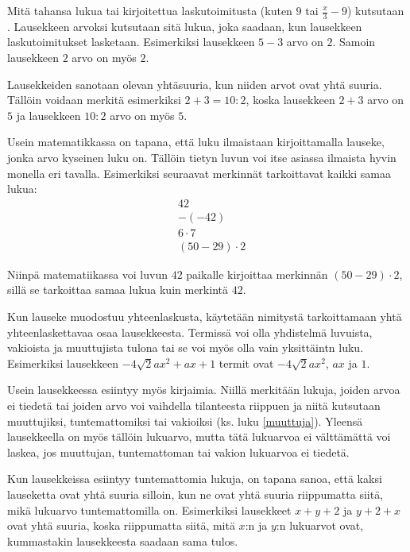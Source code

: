Mitä tahansa lukua tai kirjoitettua laskutoimitusta (kuten $9$ tai $\frac{x}{3}-9$) kutsutaan .
Lausekkeen arvoksi kutsutaan sitä lukua, joka saadaan, kun lausekkeen laskutoimitukset lasketaan. Esimerkiksi lausekkeen
$5-3$ arvo on $2$. Samoin lausekkeen $2$ arvo on myös $2$.

Lausekkeiden sanotaan olevan yhtäsuuria, kun niiden arvot ovat yhtä suuria. Tällöin voidaan merkitä esimerkiksi $2+3=10:2$,
koska lausekkeen $2+3$ arvo on $5$ ja lausekkeen $10:2$ arvo on myös $5$.

Usein matematikkassa on tapana, että luku ilmaistaan kirjoittamalla lauseke, jonka arvo kyseinen luku on. Tällöin tietyn luvun
voi itse asiassa ilmaista hyvin monella eri tavalla. Esimerkiksi seuraavat merkinnät tarkoittavat kaikki samaa lukua:
\begin{align*}
                & 42 \\ & -(-42) \\ & 6 \cdot 7 \\ & (50-29) \cdot 2                                                                                                      
\end{align*}

Niinpä matematiikassa voi luvun $42$ paikalle kirjoittaa merkinnän $(50-29)\cdot 2$, sillä se tarkoittaa samaa lukua kuin
merkintä $42$.

Kun lauseke muodostuu yhteenlaskusta, käytetään nimitystä  tarkoittamaan yhtä yhteenlaskettavaa
osaa lausekkeesta. Termissä voi olla yhdistelmä luvuista, vakioista
ja muuttujista tulona tai se voi myös olla vain yksittäintn luku. Esimerkiksi lausekkeen
$-4\sqrt{2}ax^2+ax+1$ termit ovat $-4\sqrt{2}ax^2$, $ax$ ja $1$.

Usein lausekkeessa esiintyy myös kirjaimia. Niillä merkitään lukuja, joiden arvoa ei tiedetä tai joiden arvo
voi vaihdella tilanteesta riippuen ja niitä kutsutaan muuttujiksi, tuntemattomiksi tai vakioiksi (ks. luku \ref{muuttuja}).
Yleensä lausekkeella on myös tällöin lukuarvo, mutta tätä lukuarvoa ei välttämättä voi laskea, jos muuttujan, tuntemattoman
tai vakion lukuarvoa ei tiedetä.

Kun lausekkeissa esiintyy tuntemattomia lukuja, on tapana sanoa, että kaksi lauseketta ovat yhtä suuria silloin, kun ne
ovat yhtä suuria riippumatta siitä, mikä lukuarvo tuntemattomilla on. Esimerkiksi lausekkeet $x+y+2$ ja $y+2+x$ ovat yhtä
suuria, koska riippumatta siitä, mitä $x$:n ja $y$:n lukuarvot ovat, kummastakin lausekkeesta saadaan sama tulos.


